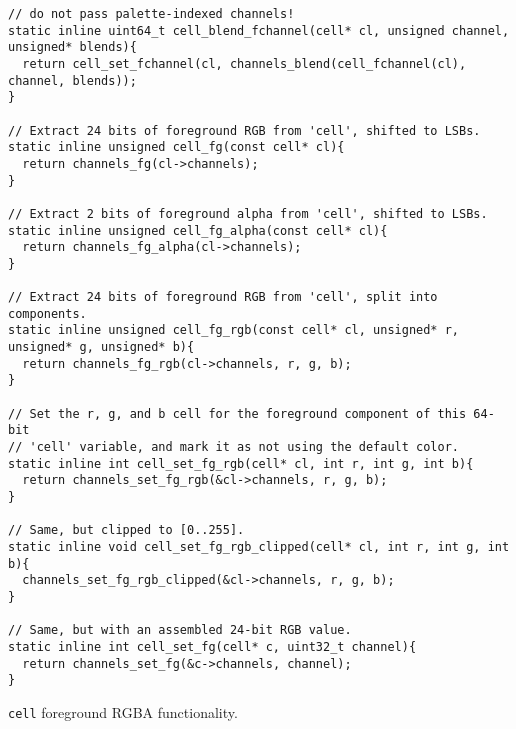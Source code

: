 \begin{listing}[!htbp]
\begin{verbatim}
// do not pass palette-indexed channels!
static inline uint64_t cell_blend_fchannel(cell* cl, unsigned channel, unsigned* blends){
  return cell_set_fchannel(cl, channels_blend(cell_fchannel(cl), channel, blends));
}

// Extract 24 bits of foreground RGB from 'cell', shifted to LSBs.
static inline unsigned cell_fg(const cell* cl){
  return channels_fg(cl->channels);
}

// Extract 2 bits of foreground alpha from 'cell', shifted to LSBs.
static inline unsigned cell_fg_alpha(const cell* cl){
  return channels_fg_alpha(cl->channels);
}

// Extract 24 bits of foreground RGB from 'cell', split into components.
static inline unsigned cell_fg_rgb(const cell* cl, unsigned* r, unsigned* g, unsigned* b){
  return channels_fg_rgb(cl->channels, r, g, b);
}

// Set the r, g, and b cell for the foreground component of this 64-bit
// 'cell' variable, and mark it as not using the default color.
static inline int cell_set_fg_rgb(cell* cl, int r, int g, int b){
  return channels_set_fg_rgb(&cl->channels, r, g, b);
}

// Same, but clipped to [0..255].
static inline void cell_set_fg_rgb_clipped(cell* cl, int r, int g, int b){
  channels_set_fg_rgb_clipped(&cl->channels, r, g, b);
}

// Same, but with an assembled 24-bit RGB value.
static inline int cell_set_fg(cell* c, uint32_t channel){
  return channels_set_fg(&c->channels, channel);
}
\end{verbatim}
\caption{\texttt{cell} foreground RGBA functionality.}
\label{listing:cellrgbfg}
\end{listing}

